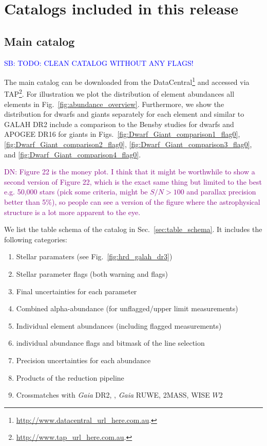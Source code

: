 \documentclass[fleqn,usenatbib,useAMS]{mnras}
\newcommand{\Gaia}{\textit{Gaia}\xspace}
\newcommand\SB[1]{\textcolor{blue}{SB: #1}}
\newcommand\DN[1]{\textcolor{purple}{DN: #1}}
\begin{document}
\section{Catalogs included in this release}  \label{sec:catalogs}

\subsection{Main catalog} \label{sec:main_catalog}

\SB{TODO: CLEAN CATALOG WITHOUT ANY FLAGS!}

The main catalog can be downloaded from the DataCentral\footnote{\url{http://www.datacentral_url_here.com.au}.} and accessed via TAP\footnote{\url{http://www.tap_url_here.com.au}.}. For illustration we plot the distribution of element abundances all elements in Fig.~\ref{fig:abundance_overview}. Furthermore, we show the distribution for dwarfs and giants separately for each element and similar to GALAH DR2 include a comparison to the Bensby studies \citep{Bensby2014, Battistini2015, Battistini2016, Bensby2018} for dwarfs and APOGEE DR16 \citep{SDSSDR16} for giants in Figs.~\ref{fig:Dwarf_Giant_comparison1_flag0}, \ref{fig:Dwarf_Giant_comparison2_flag0}, \ref{fig:Dwarf_Giant_comparison3_flag0}, and \ref{fig:Dwarf_Giant_comparison4_flag0}.

\DN{Figure 22 is the money plot. I think that it might be worthwhile to show a second version of Figure 22, which is the exact same thing but limited to the best e.g. 50,000 stars (pick some criteria, might be $S/N > 100$ and parallax precision better than 5\%), so people can see a version of the figure where the astrophysical structure is a lot more apparent to the eye.}

We list the table schema of the catalog in Sec.~\ref{sec:table_schema}. It includes the following categories:
\begin{enumerate}
\item Stellar paramaters (see Fig.~\ref{fig:hrd_galah_dr3})
\item Stellar parameter flags (both warning and flags)
\item Final uncertainties for each parameter
\item Combined alpha-abundance (for unflagged/upper limit measurements)
\item Individual element abundances (including flagged measurements)
\item individual abundance flags and bitmask of the line selection
\item Precision uncertainties for each abundance
\item Products of the reduction pipeline
\item Crossmatches with \Gaia DR2, \citet{BailerJones2018}, \Gaia RUWE, 2MASS, WISE $W2$
\end{enumerate}
\end{document}
